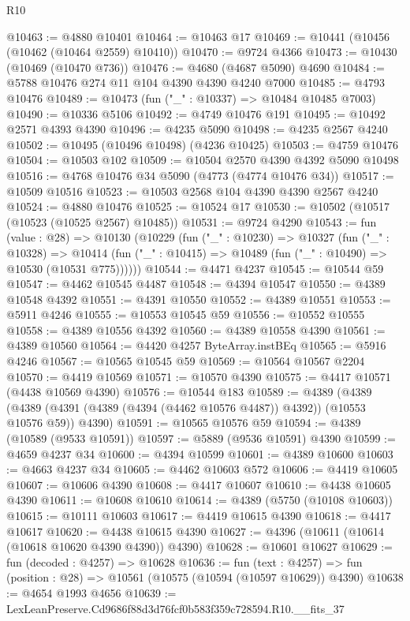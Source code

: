 \begin{lexlean}{R10}
\begin{coremodule}
@10463 := @4880 @10401
@10464 := @10463 @17
@10469 := @10441 (@10456 (@10462 (@10464 @2559) @10410))
@10470 := @9724 @4366
@10473 := @10430 (@10469 (@10470 @736))
@10476 := @4680 (@4687 @5090) @4690
@10484 := @5788 @10476 @274 @11 @104 @4390 @4390 @4240 @7000
@10485 := @4793 @10476
@10489 := @10473 (fun ("_" : @10337) => @10484 @10485 @7003)
@10490 := @10336 @5106
@10492 := @4749 @10476 @191
@10495 := @10492 @2571 @4393 @4390
@10496 := @4235 @5090
@10498 := @4235 @2567 @4240
@10502 := @10495 (@10496 @10498) (@4236 @10425)
@10503 := @4759 @10476
@10504 := @10503 @102
@10509 := @10504 @2570 @4390 @4392 @5090 @10498
@10516 := @4768 @10476 @34 @5090 (@4773 (@4774 @10476 @34))
@10517 := @10509 @10516
@10523 := @10503 @2568 @104 @4390 @4390 @2567 @4240
@10524 := @4880 @10476
@10525 := @10524 @17
@10530 := @10502 (@10517 (@10523 (@10525 @2567) @10485))
@10531 := @9724 @4290
@10543 := fun (value : @28) =>
  @10130
    (@10229
      (fun ("_" : @10230) =>
      @10327
        (fun ("_" : @10328) =>
        @10414 (fun ("_" : @10415) => @10489 (fun ("_" : @10490) => @10530 (@10531 @775))))))
@10544 := @4471 @4237
@10545 := @10544 @59
@10547 := @4462 @10545 @4487
@10548 := @4394 @10547
@10550 := @4389 @10548 @4392
@10551 := @4391 @10550
@10552 := @4389 @10551
@10553 := @5911 @4246
@10555 := @10553 @10545 @59
@10556 := @10552 @10555
@10558 := @4389 @10556 @4392
@10560 := @4389 @10558 @4390
@10561 := @4389 @10560
@10564 := @4420 @4257 ByteArray.instBEq
@10565 := @5916 @4246
@10567 := @10565 @10545 @59
@10569 := @10564 @10567 @2204
@10570 := @4419 @10569
@10571 := @10570 @4390
@10575 := @4417 @10571 (@4438 @10569 @4390)
@10576 := @10544 @183
@10589 := @4389
    (@4389 (@4389 (@4391 (@4389 (@4394 (@4462 @10576 @4487)) @4392)) (@10553 @10576 @59)) @4390)
@10591 := @10565 @10576 @59
@10594 := @4389 (@10589 (@9533 @10591))
@10597 := @5889 (@9536 @10591) @4390
@10599 := @4659 @4237 @34
@10600 := @4394 @10599
@10601 := @4389 @10600
@10603 := @4663 @4237 @34
@10605 := @4462 @10603 @572
@10606 := @4419 @10605
@10607 := @10606 @4390
@10608 := @4417 @10607
@10610 := @4438 @10605 @4390
@10611 := @10608 @10610
@10614 := @4389 (@5750 (@10108 @10603))
@10615 := @10111 @10603
@10617 := @4419 @10615 @4390
@10618 := @4417 @10617
@10620 := @4438 @10615 @4390
@10627 := @4396 (@10611 (@10614 (@10618 @10620 @4390 @4390)) @4390)
@10628 := @10601 @10627
@10629 := fun (decoded : @4257) => @10628
@10636 := fun (text : @4257) =>
  fun (position : @28) => @10561 (@10575 (@10594 (@10597 @10629)) @4390)
@10638 := @4654 @1993 @4656
@10639 := LexLeanPreserve.Cd9686f88d3d76fcf0b583f359c728594.R10.__fits_37

\end{coremodule}
\end{lexlean}
